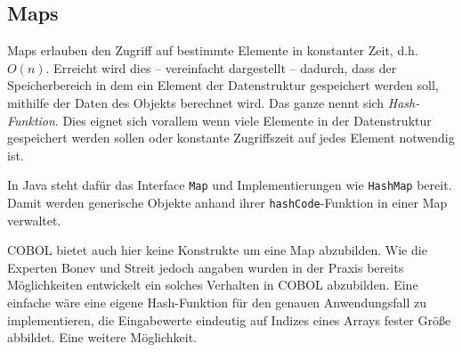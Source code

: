 \subsection{Maps}
Maps erlauben den Zugriff auf bestimmte Elemente in konstanter Zeit, d.h. $O(n)$. Erreicht wird dies -- vereinfacht dargestellt -- dadurch, dass der Speicherbereich in dem ein Element der Datenstruktur gespeichert werden soll, mithilfe der Daten des Objekts berechnet wird. Das ganze nennt sich \textit{Hash-Funktion}. Dies eignet sich vorallem wenn viele Elemente in der Datenstruktur gespeichert werden sollen oder konstante Zugriffszeit auf jedes Element notwendig ist.

In Java steht dafür das Interface \texttt{Map} und Implementierungen wie \texttt{HashMap} bereit. Damit werden generische Objekte anhand ihrer \texttt{hashCode}-Funktion in einer Map verwaltet.

COBOL bietet auch hier keine Konstrukte um eine Map abzubilden. Wie die Experten Bonev und Streit jedoch angaben wurden in der Praxis bereits Möglichkeiten entwickelt ein solches Verhalten in COBOL abzubilden. Eine einfache wäre eine eigene Hash-Funktion für den genauen Anwendungsfall zu implementieren, die Eingabewerte eindeutig auf Indizes eines Arrays fester Größe abbildet. Eine weitere Möglichkeit.